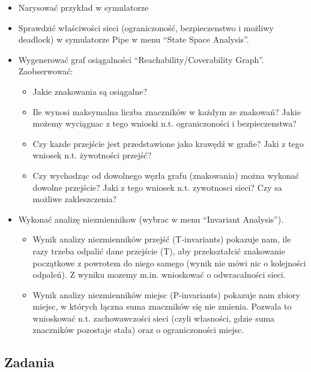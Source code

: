\documentclass[11pt]{article}
\providecommand{\tightlist}{%
      \setlength{\itemsep}{0pt}\setlength{\parskip}{0pt}}
\begin{document}
\begin{itemize}
\tightlist
\item
  Narysować przykład w symulatorze
\item
  Sprawdzić właściwości sieci (ograniczoność, bezpieczenstwo i możliwy
  deadlock) w symulatorze Pipe w menu ``State Space Analysis''.
\item
  Wygenerować graf osiągalności ``Reachability/Coverability Graph''.
  Zaobserwować:

  \begin{itemize}
  \tightlist
  \item
    Jakie znakowania są osiągalne?
  \item
    Ile wynosi maksymalna liczba znaczników w każdym ze znakowań? Jakie
    możemy wyciągnac z tego wnioski n.t. ograniczoności i
    bezpieczenstwa?
  \item
    Czy kazde przejście jest przedstawione jako krawędź w grafie? Jaki z
    tego wniosek n.t. żywotności przejść?
  \item
    Czy wychodząc od dowolnego węzła grafu (znakowania) można wykonać
    dowolne przejście? Jaki z tego wniosek n.t. zywotnosci sieci? Czy sa
    możliwe zakleszczenia?
  \end{itemize}
\item
  Wykonać analizę niezmiennikow (wybrac w menu ``Invariant Analysis'').

  \begin{itemize}
  \tightlist
  \item
    Wynik analizy niezmienników przejść (T-invariants) pokazuje nam, ile
    razy trzeba odpalić dane przejście (T), aby przekształcić znakowanie
    początkowe z powrotem do niego samego (wynik nie mówi nic o
    kolejności odpaleń). Z wyniku mozemy m.in. wnioskować o
    odwracalności sieci.
  \item
    Wynik analizy niezmienników miejsc (P-invariants) pokazuje nam
    zbiory miejsc, w których łączna suma znaczników się nie zmienia.
    Pozwala to wnioskować n.t. zachowawczości sieci (czyli własności,
    gdzie suma znaczników pozostaje stała) oraz o ograniczoności miejsc.
  \end{itemize}
\end{itemize}

    \hypertarget{zadania}{%
\subsection{Zadania}\label{zadania}}
\end{document}
